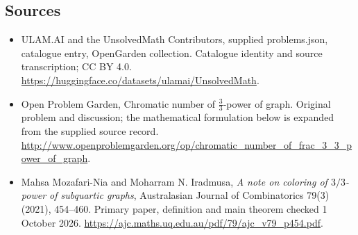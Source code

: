 \documentclass[11pt,a4paper]{article}
\begin{document}
\subsection{Sources}
\begin{itemize}
\item[S1] ULAM.AI and the UnsolvedMath Contributors, supplied problems.json, catalogue entry, OpenGarden collection. Catalogue identity and source transcription; CC BY 4.0.
\url{https://huggingface.co/datasets/ulamai/UnsolvedMath}.
\item[S2] Open Problem Garden, Chromatic number of $\frac{3}{3}$-power of graph. Original problem and discussion; the mathematical formulation below is expanded from the supplied source record.
\url{http://www.openproblemgarden.org/op/chromatic_number_of_frac_3_3_power_of_graph}.

\item[R1] Mahsa Mozafari-Nia and Moharram N. Iradmusa,
\emph{A note on coloring of $3/3$-power of subquartic graphs},
Australasian Journal of Combinatorics 79(3) (2021), 454--460.
Primary paper, definition and main theorem checked 1 October 2026.
\url{https://ajc.maths.uq.edu.au/pdf/79/ajc_v79_p454.pdf}.

\end{itemize}
\end{document}

